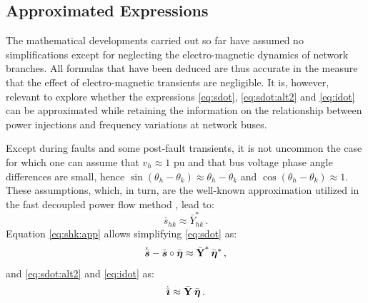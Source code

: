 \documentclass[journal, twocolumn, letter]{IEEEtran}
\newcommand{\bfg}[1]{\boldsymbol{#1}}
\newcommand{\bfb}[1]{\boldsymbol{\rm #1}}
\newcommand{\Yhk}{\bar{Y}_{hk}}
\newcommand{\vh}{v_h}
\newcommand{\shk}{\bar{s}_{hk}}
\renewcommand{\th}{\theta_h}
\newcommand{\tk}{\theta_k}
\newcommand{\ii}{\imath}
\newcommand{\idot}{\dot{\bar{\bfg \ii}}}
\newcommand{\svec}{\bar{\bfg s}}
\newcommand{\sdot}{\dot{\bar{\bfg s}}}
\newcommand{\evec}{\bar{\bfg \eta}}
\newcommand{\Ybus}{\bar{\bfb Y}}
\begin{document}
\subsection{Approximated Expressions}
\label{sub:simple}

The mathematical developments carried out so far have assumed no
simplifications except for neglecting the electro-magnetic dynamics of
network branches.  All formulas that have been deduced are thus
accurate in the measure that the effect of electro-magnetic transients
are negligible.  It is, however, relevant to explore whether the
expressions \eqref{eq:sdot}, \eqref{eq:sdot:alt2} and \eqref{eq:idot}
can be approximated while retaining the information on the
relationship between power injections and frequency variations at
network buses.

 Except during faults and some post-fault transients, it
is not uncommon the case for which one can assume  that
$\vh \approx 1$ pu and that bus voltage phase angle differences are
small, hence $\sin (\th-\tk)\approx \th-\tk$ and
$\cos (\th-\tk)\approx 1$.  These assumptions, which, in turn, are the
well-known approximation utilized in the fast decoupled power flow
method \cite{Stott:1974}, lead to:
\begin{equation}
  \label{eq:shk:app}
  \shk \approx \Yhk^* \, .
\end{equation}
Equation \eqref{eq:shk:app} allows simplifying 
\eqref{eq:sdot} as:
\begin{equation}
  \label{eq:sdot:app1}
  \sdot - \svec \circ \evec \approx \Ybus^* \, \evec^* \, ,
\end{equation}
and \eqref{eq:sdot:alt2} and \eqref{eq:idot} as:
\begin{equation}
  \label{eq:idot:app1}
  \idot \approx \Ybus \, \evec \, .
\end{equation}
\end{document}
